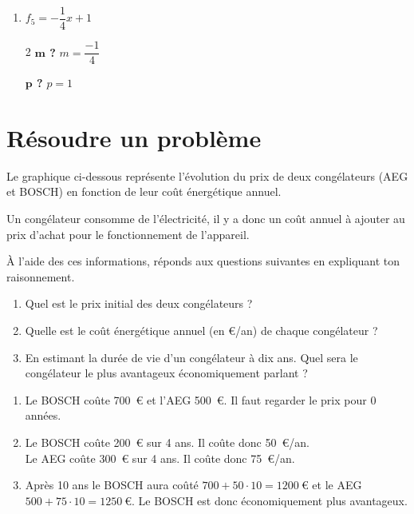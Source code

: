 \documentclass[a4paper, 12pt, parskip=half-]{scrartcl}
\begin{document}
\begin{solution}
\begin{enumerate}
\begin{multicols}{2}
                  \textbf{$\bm{p}$ ?}
                  \medbreak
                  $f_4$ est linéaire $\Rightarrow p=0$
              \end{multicols}
        \item $f_5 = -\dfrac{1}{4}x + 1 $
              \begin{multicols}{2}
                  \textbf{$\bm{m}$ ?}
                  \medbreak
                  $m=\dfrac{-1}{4}$
                  \columnbreak

                  \textbf{$\bm{p}$ ?}
                  \medbreak
                  $p=1$
              \end{multicols}
    \end{enumerate}
    \newpage
\end{solution}
\section*{ Résoudre un problème}
\begin{exercise}[points=4]
    Le graphique ci-dessous représente l'évolution du prix de deux congélateurs (AEG et BOSCH) en fonction de leur coût énergétique annuel. 
    
    Un congélateur consomme de l'électricité, il y a donc un coût annuel à ajouter au prix d'achat pour le fonctionnement de l'appareil.
    
    À l'aide des ces informations, réponds aux questions suivantes en expliquant ton raisonnement.
    \begin{enumerate}
        \item Quel est le prix initial des deux congélateurs ?
        \item Quelle est le coût énergétique annuel (en €/an) de chaque congélateur ?
        \item En estimant la durée de vie d'un congélateur à dix ans. Quel sera le congélateur le plus avantageux économiquement parlant ?
    \end{enumerate}
    \begin{center}
        
    \end{center}
\end{exercise}
\begin{solution}
    \begin{enumerate}
        \item Le BOSCH coûte 700~€ et l'AEG 500~€. Il faut regarder le prix pour 0 années.
        \item Le BOSCH coûte 200~€ sur 4 ans. Il coûte donc 50~€/an.\\
        Le AEG coûte 300~€ sur 4 ans. Il coûte donc 75~€/an.
        \item Après 10 ans le BOSCH aura coûté $700 + 50\cdot 10 = 1200~€$ et le AEG $500 + 75\cdot 10 = 1250~€$. Le BOSCH est donc économiquement plus avantageux.
    \end{enumerate}
\end{solution}
\end{document}
